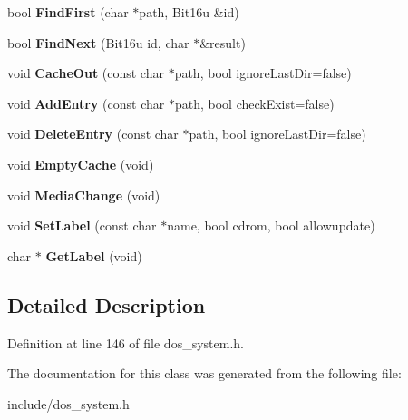 \begin{DoxyCompactItemize}
\item 
\hypertarget{classDOS__Drive__Cache_ae19e2c7e6730d76b492bbc62d0edb38f}{bool {\bfseries Find\-First} (char $\ast$path, Bit16u \&id)}\label{classDOS__Drive__Cache_ae19e2c7e6730d76b492bbc62d0edb38f}

\item 
\hypertarget{classDOS__Drive__Cache_a8c3297b5ea4a5b10ccf1e9bfd6e4b2c6}{bool {\bfseries Find\-Next} (Bit16u id, char $\ast$\&result)}\label{classDOS__Drive__Cache_a8c3297b5ea4a5b10ccf1e9bfd6e4b2c6}

\item 
\hypertarget{classDOS__Drive__Cache_ac1cf68069ab790fb1b3a35686b3625c6}{void {\bfseries Cache\-Out} (const char $\ast$path, bool ignore\-Last\-Dir=false)}\label{classDOS__Drive__Cache_ac1cf68069ab790fb1b3a35686b3625c6}

\item 
\hypertarget{classDOS__Drive__Cache_a88416281f2c92dbd802bf1cc77153bdb}{void {\bfseries Add\-Entry} (const char $\ast$path, bool check\-Exist=false)}\label{classDOS__Drive__Cache_a88416281f2c92dbd802bf1cc77153bdb}

\item 
\hypertarget{classDOS__Drive__Cache_a68d34280ef1d383e84f98f2df46de333}{void {\bfseries Delete\-Entry} (const char $\ast$path, bool ignore\-Last\-Dir=false)}\label{classDOS__Drive__Cache_a68d34280ef1d383e84f98f2df46de333}

\item 
\hypertarget{classDOS__Drive__Cache_a37fc4a803fa8ac753d3e084ee52e0daf}{void {\bfseries Empty\-Cache} (void)}\label{classDOS__Drive__Cache_a37fc4a803fa8ac753d3e084ee52e0daf}

\item 
\hypertarget{classDOS__Drive__Cache_a6015de7335a108069e32a1fdebfcd890}{void {\bfseries Media\-Change} (void)}\label{classDOS__Drive__Cache_a6015de7335a108069e32a1fdebfcd890}

\item 
\hypertarget{classDOS__Drive__Cache_af5f0e25edd0f18d6ccaeb7349ec412a3}{void {\bfseries Set\-Label} (const char $\ast$name, bool cdrom, bool allowupdate)}\label{classDOS__Drive__Cache_af5f0e25edd0f18d6ccaeb7349ec412a3}

\item 
\hypertarget{classDOS__Drive__Cache_a5226fd65de22dc1ed73103dce3b6d668}{char $\ast$ {\bfseries Get\-Label} (void)}\label{classDOS__Drive__Cache_a5226fd65de22dc1ed73103dce3b6d668}

\end{DoxyCompactItemize}


\subsection{Detailed Description}


Definition at line 146 of file dos\-\_\-system.\-h.



The documentation for this class was generated from the following file\-:\begin{DoxyCompactItemize}
\item 
include/dos\-\_\-system.\-h\end{DoxyCompactItemize}
